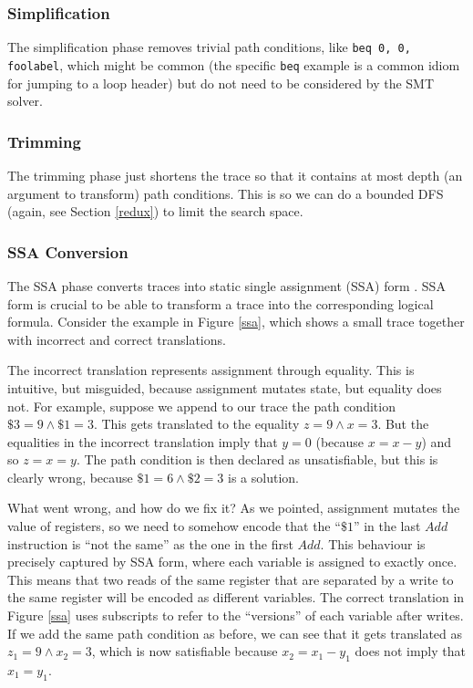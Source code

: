 \documentclass{llncs}
\begin{document}
\subsubsection{Simplification}

The simplification phase removes trivial path conditions, like \lstinline{beq 0, 0, foolabel}, which might be common (the specific \lstinline{beq} example is a common idiom for jumping to a loop header) but do not need to be considered by the SMT solver.

\subsubsection{Trimming}

The trimming phase just shortens the trace so that it contains at most \textsf{depth} (an argument to \textsf{transform}) path conditions. This is so we can do a bounded DFS (again, see Section \ref{redux}) to limit the search space.

\subsubsection{SSA Conversion}
\label{ssaconv}

The SSA phase converts traces into static single assignment (SSA) form \cite{cytron1991efficiently}. SSA form is crucial to be able to transform a trace into the corresponding logical formula. Consider the example in Figure \ref{ssa}, which shows a small trace together with incorrect and correct translations.

The incorrect translation represents assignment through equality. This is intuitive, but misguided, because assignment mutates state, but equality does not. For example, suppose we append to our trace the path condition $\$3 = 9 \land \$1 = 3$. This gets translated to the equality $z = 9 \land x = 3$. But the equalities in the incorrect translation imply that $y = 0$ (because $x = x - y$) and so $z = x = y$. The path condition is then declared as unsatisfiable, but this is clearly wrong, because $\$1 = 6 \land \$2 = 3$ is a solution. 

What went wrong, and how do we fix it? As we pointed, assignment mutates the value of registers, so we need to somehow encode that the ``$\$1$'' in the last $Add$ instruction is ``not the same'' as the one in the first $Add$. This behaviour is precisely captured by SSA form, where each variable is assigned to exactly once. This means that two reads of the same register that are separated by a write to the same register will be encoded as different variables. The correct translation in Figure \ref{ssa} uses subscripts to refer to the ``versions'' of each variable after writes. If we add the same path condition as before, we can see that it gets translated as $z_1 = 9 \land x_2 = 3$, which is now satisfiable because $x_2 = x_1 - y_1$ does not imply that $x_1 = y_1$.
\end{document}
